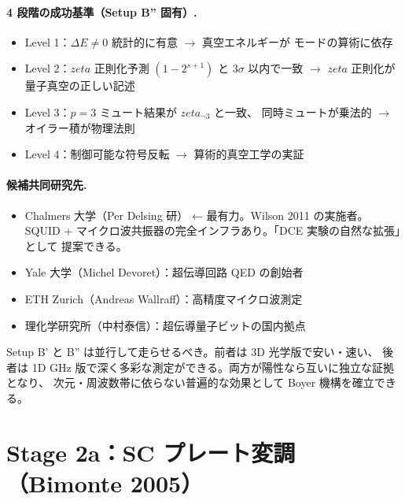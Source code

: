 \documentclass[11pt,a4paper]{article}
\def\zeta{zeta}%
\def\textbf#1{#1}%
\begin{document}
\paragraph{4 段階の成功基準（Setup B'' 固有）.}
\begin{itemize}
\item \textbf{Level 1}：$\Delta E \neq 0$ 統計的に有意 $\to$ 真空エネルギーが
  モードの算術に依存
\item \textbf{Level 2}：$\zeta$ 正則化予測 $(1 - 2^{s+1})$ と $3\sigma$ 以内で一致
  $\to$ $\zeta$ 正則化が量子真空の正しい記述
\item \textbf{Level 3}：$p=3$ ミュート結果が $\zeta_{\neg 3}$ と一致、
  同時ミュートが乗法的 $\to$ \textbf{オイラー積が物理法則}
\item \textbf{Level 4}：制御可能な符号反転 $\to$ 算術的真空工学の実証
\end{itemize}

\paragraph{候補共同研究先.}
\begin{itemize}
\item \textbf{Chalmers 大学（Per Delsing 研）} ← 最有力。Wilson 2011 の実施者。
  SQUID + マイクロ波共振器の完全インフラあり。「DCE 実験の自然な拡張」として
  提案できる。
\item Yale 大学（Michel Devoret）：超伝導回路 QED の創始者
\item ETH Zurich（Andreas Wallraff）：高精度マイクロ波測定
\item 理化学研究所（中村泰信）：超伝導量子ビットの国内拠点
\end{itemize}

\begin{tcolorbox}[colback=green!5,colframe=green!50!black]
\textbf{Setup B' と B'' は並行して走らせるべき}。前者は 3D 光学版で安い・速い、
後者は 1D GHz 版で深く多彩な測定ができる。両方が陽性なら互いに独立な証拠となり、
\textbf{次元・周波数帯に依らない普遍的な効果}として Boyer 機構を確立できる。
\end{tcolorbox}

\newpage

\section{Stage 2a：SC プレート変調（Bimonte 2005）}
\end{document}
